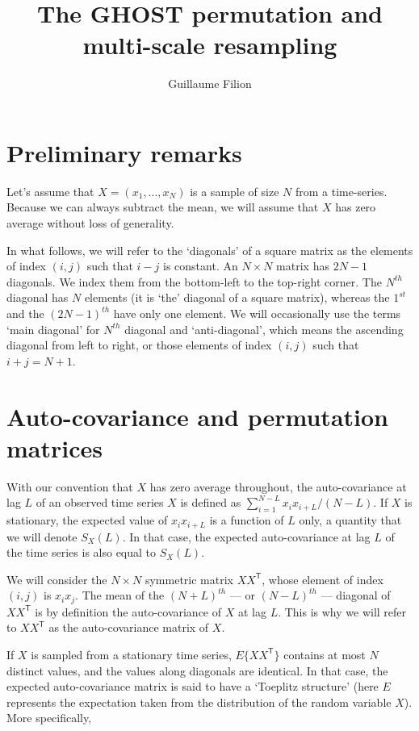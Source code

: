 \documentclass[12pt]{article}
\title{The GHOST permutation and multi-scale resampling}
\author{Guillaume Filion}
\date{}
\begin{document}
  \maketitle

  \section{Preliminary remarks}

  Let's assume that $X = (x_1, ..., x_N)$ is a sample of size
  $N$ from a time-series. Because we can always subtract the
  mean, we will assume that $X$ has zero average without
  loss of generality.

  In what follows, we will refer to the `diagonals' of a square
  matrix as the elements of index $(i,j)$ such that $i-j$ is
  constant. An $N \times N$ matrix has $2N-1$ diagonals. We index
  them from the bottom-left to the top-right corner. The $N^{th}$
  diagonal has $N$ elements (it is `the' diagonal of a square matrix),
  whereas the $1^{st}$ and the $(2N-1)^{th}$ have only one element.
  We will occasionally use the terms `main diagonal' for $N^{th}$
  diagonal and `anti-diagonal', which means the ascending diagonal
  from left to right, or those elements of index $(i,j)$ such that
  $i+j=N+1$.

  \section{Auto-covariance and permutation matrices}

  With our convention that  $X$ has zero average throughout,
  the auto-covariance at lag $L$ of an observed time series $X$ is
  defined as $\sum_{i=1}^{N-L}x_i x_{i+L}/(N-L)$. If $X$ is stationary,
  the expected value of $x_i x_{i+L}$ is a function of $L$ only,
  a quantity that we will denote $S_X(L)$. In that case, the expected
  auto-covariance at lag $L$ of the time series is also equal to
  $S_X(L)$.

  We will consider the $N \times N$ symmetric matrix $XX^\mathsf{T}$,
  whose element of index $(i,j)$ is $x_i x_j$. The mean of the
  $(N+L)^{th}$ --- or $(N-L)^{th}$ --- diagonal of $XX^\mathsf{T}$ is by
  definition the auto-covariance of $X$ at lag $L$. This is why 
  we will refer to $XX^\mathsf{T}$ as the auto-covariance matrix
  of $X$.

  If $X$ is sampled from a stationary time series, $E\{XX^\mathsf{T}\}$
  contains at most $N$ distinct values, and the values along diagonals
  are identical. In that case, the expected auto-covariance matrix
  is said to have a `Toeplitz structure' (here $E$ represents the
  expectation taken from the distribution of the random variable $X$).
  More specifically,
\end{document}
